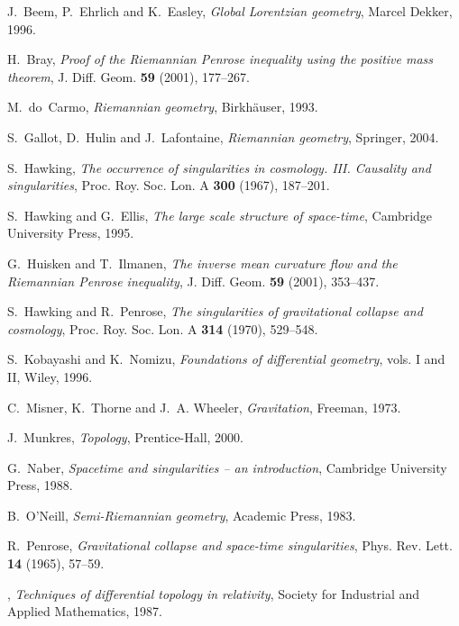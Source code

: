 \documentclass[10pt]{amsart}
\theoremstyle{definition}
\theoremstyle{remark}
\begin{document}
 
\begin{thebibliography}{MTW73}

J.~Beem, P.~Ehrlich and K.~Easley, \emph{Global Lorentzian geometry}, Marcel
  Dekker, 1996.

H.~Bray, \emph{Proof of the Riemannian Penrose inequality using the positive
  mass theorem}, J. Diff. Geom. \textbf{59} (2001), 177--267.

M.~do~Carmo, \emph{Riemannian geometry}, Birkh\"auser, 1993.

S.~Gallot, D.~Hulin and J.~Lafontaine, \emph{Riemannian geometry}, Springer,
  2004.

S.~Hawking, \emph{The occurrence of singularities in cosmology. III. Causality
  and singularities}, Proc. Roy. Soc. Lon. A \textbf{300} (1967), 187--201.

S.~Hawking and G.~Ellis, \emph{The large scale structure of space-time},
  Cambridge University Press, 1995.

G.~Huisken and T.~Ilmanen, \emph{The inverse mean curvature flow and the
  Riemannian Penrose inequality}, J. Diff. Geom. \textbf{59} (2001), 353--437.

S.~Hawking and R.~Penrose, \emph{The singularities of gravitational collapse
  and cosmology}, Proc. Roy. Soc. Lon. A \textbf{314} (1970), 529--548.

S.~Kobayashi and K.~Nomizu, \emph{Foundations of differential geometry}, vols. I
  and II, Wiley, 1996.

C.~Misner, K.~Thorne and J.~A. Wheeler, \emph{Gravitation}, Freeman, 1973.

J.~Munkres, \emph{Topology}, Prentice-Hall, 2000.

G.~Naber, \emph{Spacetime and singularities -- an introduction}, Cambridge
  University Press, 1988.

B.~O'Neill, \emph{Semi-Riemannian geometry}, Academic Press, 1983.

R.~Penrose, \emph{Gravitational collapse and space-time singularities}, Phys.
  Rev. Lett. \textbf{14} (1965), 57--59.

\bysame, \emph{Techniques of differential topology in relativity}, Society for
  Industrial and Applied Mathematics, 1987.


\end{thebibliography}
\end{document}

